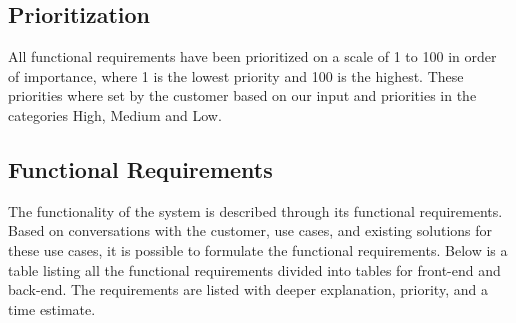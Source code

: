 \documentclass[11pt,a4paper,titlepage,oneside]{report}
\begin{document}
  \subsection{Prioritization}
  All functional requirements have been prioritized on a scale of 1 to 100 in order of importance, where 1 is the lowest priority and 100 is the highest. These priorities where set by the customer based on our input and priorities in the categories High, Medium and Low.

  \subsection{Functional Requirements}
  The functionality of the system is described through its functional requirements. Based on  conversations with the customer, use cases, and existing solutions for these use cases, it is possible to formulate the functional requirements. Below is a table listing all the functional requirements divided into tables for \gls{front-end} and \gls{back-end}. The requirements are listed with deeper explanation, priority, and a time estimate.
  \\
\end{document}
